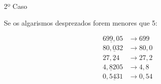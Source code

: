 \documentclass[aspectratio=169,10pt]{beamer}
\begin{document}

\begin{frame}{2º Caso}

Se os algarismos desprezados forem menores que 5:

\begin{align*}
69\underline{9},05 &\rightarrow 699 \\
80,\underline{0}32 &\rightarrow 80,0 \\
27,\underline{2}4 &\rightarrow 27,2 \\
4,\underline{8}205 &\rightarrow 4,8 \\
0,5\underline{4}31 &\rightarrow 0,54
\end{align*}

\end{frame}

\end{document}
